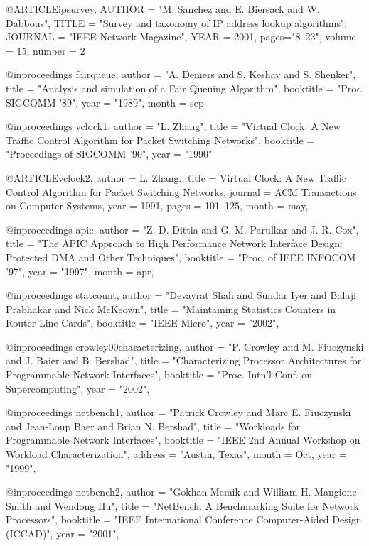 @ARTICLE{ipsurvey,
	AUTHOR = "M. Sanchez and E. Biersack and W. Dabbous",
	TITLE = "Survey and taxonomy of {IP} address lookup algorithms",
	JOURNAL = "IEEE Network Magazine",
	YEAR = 2001,
	pages="8--23",
	volume		= 15,
	number		= 2
}


@inproceedings{ fairqueue,
    author = "A. Demers and S. Keshav and S. Shenker",
    title = "Analysis and simulation of a Fair Queuing Algorithm",
    booktitle = "Proc. {SIGCOMM} '89",
    year = "1989",
    month = sep
}


@inproceedings{ vclock1,
    author = "L. Zhang",
    title = "Virtual Clock: A New Traffic Control Algorithm for Packet Switching Networks",
    booktitle = "Proceedings of {SIGCOMM} '90",
    year = "1990"
}

@ARTICLE{vclock2,
  author =       {L. Zhang.},
  title =        {Virtual Clock: A New Traffic Control Algorithm for Packet Switching Networks},
  journal =      {ACM Transactions on Computer Systems},
  year =         1991,
  pages =        {101--125},
  month =        may,
}


@inproceedings{ apic,
    author = "Z. D. Dittia and G. M. Parulkar and J. R. Cox",
    title = "The {APIC} Approach to High Performance Network Interface Design: Protected {DMA} and Other Techniques",
    booktitle = "Proc. of {IEEE} {INFOCOM }'97",
    year = "1997",
    month = apr,
}

@inproceedings{ statcount,
    author = "Devavrat Shah and Sundar Iyer and Balaji Prabhakar and Nick McKeown",
    title = "Maintaining Statistics Counters in Router Line Cards",
    booktitle = "IEEE Micro",
    year = "2002",
}


@inproceedings{ crowley00characterizing,
    author = "P. Crowley and M. Fiuczynski and J. Baier and B. Bershad",
    title = "Characterizing Processor Architectures for Programmable Network Interfaces",
    booktitle = "Proc. Intn'l Conf. on Supercomputing",
    year = "2002",
}

@inproceedings{ netbench1,
	author = "Patrick Crowley and Marc E. Fiuczynski and  Jean-Loup Baer and Brian N. Bershad",
	title = "Workloads for Programmable Network Interfaces",
	booktitle = "IEEE 2nd Annual Workshop on Workload Characterization",
	address = "Austin, Texas",
	month = Oct,
	year = "1999",
}

@inproceedings{ netbench2,
    author = "Gokhan Memik and William H. Mangione-Smith and Wendong Hu",
    title = "NetBench: A Benchmarking Suite for Network Processors",
    booktitle = "IEEE International Conference Computer-Aided Design (ICCAD)",
    year = "2001",
}

